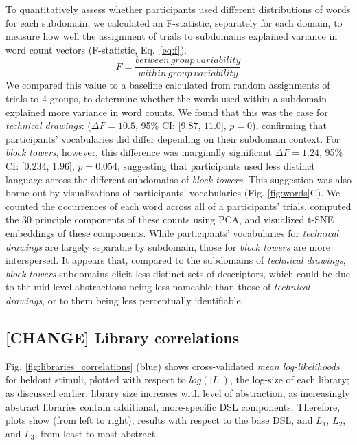 \documentclass[10pt,letterpaper]{article}
\begin{document}
To quantitatively assess whether participants used different distributions of words for each subdomain, we calculated an F-statistic, separately for each domain, to measure how well the assignment of trials to subdomains explained variance in word count vectors (F-statistic, Eq.~\ref{eq:f}).
\begin{equation} \label{eq:f}
F = \dfrac{between\, group\, variability}{within\, group\, variability}
\end{equation}
We compared this value to a baseline calculated from random assignments of trials to 4 groups, to determine whether the words used within a subdomain explained more variance in word counts.
We found that this was the case for \textit{technical drawings}: ($\Delta F = 10.5$, 95\% CI: [$9.87$, $11.0$], $p=0$), confirming that participants' vocabularies did differ depending on their subdomain context. %
For \textit{block towers}, however, this difference was marginally significant $\Delta F = 1.24$, 95\% CI: [$0.234$, $1.96$], $p=0.054$, suggesting that participants used less distinct language across the different subdomains of \textit{block towers}.
This suggestion was also borne out by visualizations of participants' vocabularies (Fig. \ref{fig:words}C).
We counted the occurrences of each word across all of a participants' trials, computed the 30 principle components of these counts using PCA, and visualized t-SNE embeddings of these components.
While participants' vocabularies for \textit{technical drawings} are largely separable by subdomain, those for \textit{block towers} are more interspersed.
It appears that, compared to the subdomains of \textit{technical drawings}, \textit{block towers} subdomains elicit less distinct sets of descriptors, which could be due to the mid-level abstractions being less nameable than those of \textit{technical drawings}, or to them being less perceptually identifiable. %


\subsection{[CHANGE] Library correlations}

Fig. \ref{fig:libraries_correlations} (blue) shows cross-validated \textit{mean log-likelihoods} for heldout stimuli, plotted with respect to $log(|L|)$, the log-size of each library; as discussed earlier, library size increases with level of abstraction, as increasingly abstract libraries contain additional, more-specific DSL components. Therefore, plots show (from left to right), results with respect to the base DSL, and $L_1$, $L_2$, and $L_3$, from least to most abstract. 
\end{document}
